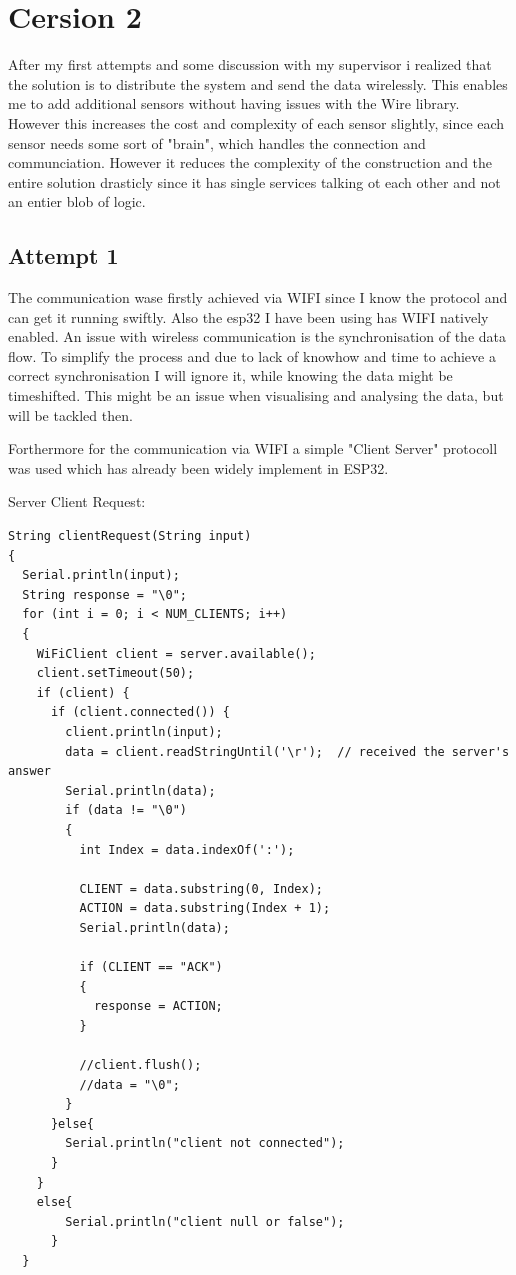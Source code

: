 \chapter*{Cersion 2}
\label{chap:Technical CHallenges}
\renewcommand{\thesection}{\arabic{section}}
\setcounter{section}{0}

After my first attempts and some discussion with my supervisor i realized that the solution is to distribute the system and send the data wirelessly. This enables me to add additional sensors without having issues with the Wire library. However this increases the cost and complexity of each sensor slightly, since each sensor needs some sort of "brain", which handles the connection and communciation. 
However it reduces the complexity of the construction and the entire solution drasticly since it has single services talking ot each other and not an entier blob of logic. 

\section{Attempt 1}

The communication wase firstly achieved via WIFI since I know the protocol and can get it running swiftly. Also the esp32 I have been using has WIFI natively enabled. 
An issue with wireless communication is the synchronisation of the data flow. To simplify the process and due to lack of knowhow and time to achieve a correct synchronisation I will ignore it, while knowing the data might be timeshifted. 
This might be an issue when visualising and analysing the data, but will be tackled then.

Forthermore for the communication via WIFI a simple "Client Server" protocoll was used which has already been widely implement in ESP32.

Server Client Request: 
\begin{lstlisting}
String clientRequest(String input)
{
  Serial.println(input);
  String response = "\0";
  for (int i = 0; i < NUM_CLIENTS; i++)
  {
    WiFiClient client = server.available();
    client.setTimeout(50);
    if (client) {
      if (client.connected()) {
        client.println(input);
        data = client.readStringUntil('\r');  // received the server's answer
        Serial.println(data);
        if (data != "\0")
        {
          int Index = data.indexOf(':');
        
          CLIENT = data.substring(0, Index);
          ACTION = data.substring(Index + 1);
          Serial.println(data);
   
          if (CLIENT == "ACK")
          {
            response = ACTION;
          }

          //client.flush();
          //data = "\0";
        }
      }else{
        Serial.println("client not connected");
      }
    }
    else{
        Serial.println("client null or false");
      }
  }
\end{lstlisting}

